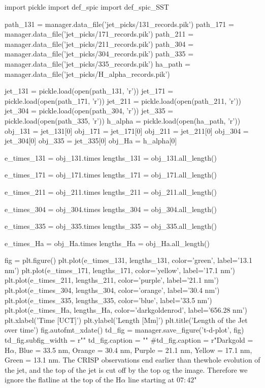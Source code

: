 \documentclass{emulateapj}
\begin{document}
\begin{pycode}[T-D-plots]
import pickle
import def_spic
import def_spic_SST

path_131 = manager.data_file('jet_picks/131_records.pik')
path_171 = manager.data_file('jet_picks/171_records.pik')
path_211 = manager.data_file('jet_picks/211_records.pik')
path_304 = manager.data_file('jet_picks/304_records.pik')
path_335 = manager.data_file('jet_picks/335_records.pik')
ha_path = manager.data_file('jet_picks/H_alpha_records.pik')

jet_131 = pickle.load(open(path_131, 'r'))
jet_171 = pickle.load(open(path_171, 'r'))
jet_211 = pickle.load(open(path_211, 'r'))
jet_304 = pickle.load(open(path_304, 'r'))
jet_335 = pickle.load(open(path_335, 'r'))
h_alpha = pickle.load(open(ha_path, 'r'))
obj_131 = jet_131[0]
obj_171 = jet_171[0]
obj_211 = jet_211[0]
obj_304 = jet_304[0]
obj_335 = jet_335[0]
obj_Ha = h_alpha[0]

e_times_131 = obj_131.times
lengths_131 = obj_131.all_length()

e_times_171 = obj_171.times
lengths_171 = obj_171.all_length()

e_times_211 = obj_211.times
lengths_211 = obj_211.all_length()

e_times_304 = obj_304.times
lengths_304 = obj_304.all_length()

e_times_335 = obj_335.times
lengths_335 = obj_335.all_length()

e_times_Ha = obj_Ha.times
lengths_Ha = obj_Ha.all_length()

fig = plt.figure()
plt.plot(e_times_131, lengths_131, color='green', label='13.1 nm')
plt.plot(e_times_171, lengths_171, color='yellow', label='17.1 nm')
plt.plot(e_times_211, lengths_211, color='purple', label='21.1 nm')
plt.plot(e_times_304, lengths_304, color='orange', label='30.4 nm')
plt.plot(e_times_335, lengths_335, color='blue', label='33.5 nm')
plt.plot(e_times_Ha, lengths_Ha, color='darkgoldenrod', label='656.28 nm')
plt.xlabel('Time [UCT]')
plt.ylabel('Length [Mm]')
plt.title('Length of the Jet over time')
fig.autofmt_xdate()
td_fig = manager.save_figure('t-d-plot', fig)
td_fig.subfig_width = r"\columnwidth"
td_fig.caption = ""
#td_fig.caption = r"Darkgold = H$\alpha$, Blue = 33.5 nm, Orange = 30.4 nm, Purple = 21.1 nm, Yellow = 17.1 nm, Green = 13.1 nm. The CRISP observations end earlier than thewhole evolution of the jet, and the top of the jet is cut off by the top og the image. Therefore we ignore the flatline at the top of the H$\alpha$ line starting at $07:42$"
\end{pycode}
\end{document}
